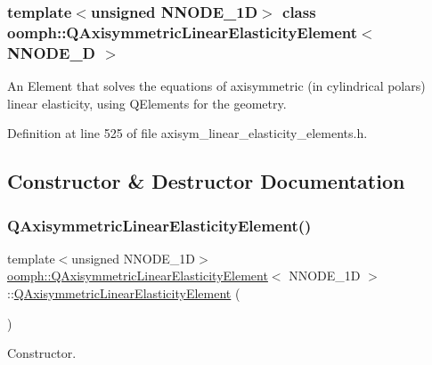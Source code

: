 \subsubsection*{template$<$unsigned N\+N\+O\+D\+E\+\_\+1D$>$\newline
class oomph\+::\+Q\+Axisymmetric\+Linear\+Elasticity\+Element$<$ N\+N\+O\+D\+E\+\_\+D $>$}

An Element that solves the equations of axisymmetric (in cylindrical polars) linear elasticity, using Q\+Elements for the geometry. 

Definition at line 525 of file axisym\+\_\+linear\+\_\+elasticity\+\_\+elements.\+h.



\subsection{Constructor \& Destructor Documentation}
\mbox{\label{classoomph_1_1QAxisymmetricLinearElasticityElement_a8d8d6c9c7a7ea32e95643a3314b08402}} 
\subsubsection{\texorpdfstring{Q\+Axisymmetric\+Linear\+Elasticity\+Element()}{QAxisymmetricLinearElasticityElement()}}
{\footnotesize\ttfamily template$<$unsigned N\+N\+O\+D\+E\+\_\+1D$>$ \\
\hyperlink{classoomph_1_1QAxisymmetricLinearElasticityElement}{oomph\+::\+Q\+Axisymmetric\+Linear\+Elasticity\+Element}$<$ N\+N\+O\+D\+E\+\_\+1D $>$\+::\hyperlink{classoomph_1_1QAxisymmetricLinearElasticityElement}{Q\+Axisymmetric\+Linear\+Elasticity\+Element} (\begin{DoxyParamCaption}{ }\end{DoxyParamCaption})\hspace{0.3cm}{\ttfamily [inline]}}



Constructor. 



